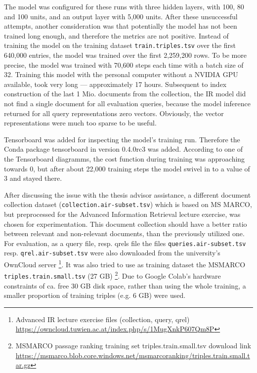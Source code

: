 The model was configured for these runs with three hidden layers, with 100, 80 and 100 units,
    and an output layer with 5,000 units.
After these unsuccessful attempts, another consideration was that potentially the model has not been trained
    long enough, and therefore the metrics are not positive.
Instead of training the model on the training dataset \verb|train.triples.tsv| over the first 640,000 entries,
    the model was trained over the first 2,259,200 rows.
To be more precise, the model was trained with 70,600 steps each time with a batch size of 32.
Training this model with the personal computer without a NVIDIA GPU available, took very long --- 
    approximately 17 hours.
Subsequent to index construction of the last 1 Mio. documents from the collection,
    the IR model did not find a single document for all evaluation queries,
    because the model inference returned for all query representations zero vectors.
Obviously, the vector representations were much too sparse to be useful.


Tensorboard was added for inspecting the model's training run.
Therefore the Conda package tensorboard in version 0.4.0rc3 was added.
According to one of the Tensorboard diagramms, the cost function during training
    was approaching towards 0, but after about 22,000 training steps the model
    swivel in to a value of 3 and stayed there.

After discussing the issue with the thesis advisor assistance, 
    a different document collection dataset (\verb|collection.air-subset.tsv|) 
    which is based on MS MARCO, but preprocessed for the Advanced Information Retrieval 
    lecture exercise, was chosen for experimentation.
This document collection should have a better ratio between relevant and non-relevant documents,
    than the previously utilized one.
For evaluation, as a query file, resp. qrels file the files \verb|queries.air-subset.tsv| resp.
    \verb|qrel.air-subset.tsv| were also downloaded from the university's OwnCloud server 
    \footnote{Advanced IR lecture exercise files (collection, query, qrel) \url{https://owncloud.tuwien.ac.at/index.php/s/1MugXnkP607Qm8P}}.
It was also tried to use as training dataset the MSMARCO \verb|triples.train.small.tsv| (27 GB)
    \footnote{MSMARCO passage ranking training set triples.train.small.tsv download link \url{https://msmarco.blob.core.windows.net/msmarcoranking/triples.train.small.tar.gz}}.
Due to Google Colab's hardware constraints of ca. free 30 GB disk space, rather than using the whole training,
    a smaller proportion of training triples (e.g. 6 GB) were used.

